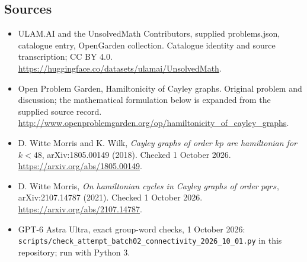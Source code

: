 \documentclass[11pt,a4paper]{article}
\begin{document}
\subsection{Sources}
\begin{itemize}
\item[S1] ULAM.AI and the UnsolvedMath Contributors, supplied problems.json, catalogue entry, OpenGarden collection. Catalogue identity and source transcription; CC BY 4.0.
\url{https://huggingface.co/datasets/ulamai/UnsolvedMath}.
\item[S2] Open Problem Garden, Hamiltonicity of Cayley graphs. Original problem and discussion; the mathematical formulation below is expanded from the supplied source record.
\url{http://www.openproblemgarden.org/op/hamiltonicity_of_cayley_graphs}.
\item[S3] D. Witte Morris and K. Wilk, \emph{Cayley graphs of order $kp$ are hamiltonian for $k<48$}, arXiv:1805.00149 (2018). Checked 1 October 2026.
\url{https://arxiv.org/abs/1805.00149}.
\item[S4] D. Witte Morris, \emph{On hamiltonian cycles in Cayley graphs of order $pqrs$}, arXiv:2107.14787 (2021). Checked 1 October 2026.
\url{https://arxiv.org/abs/2107.14787}.
\item[S5] GPT-6 Astra Ultra, exact group-word checks, 1 October 2026: \texttt{scripts/check\_attempt\_batch02\_connectivity\_2026\_10\_01.py} in this repository; run with Python 3.
\end{itemize}
\end{document}
